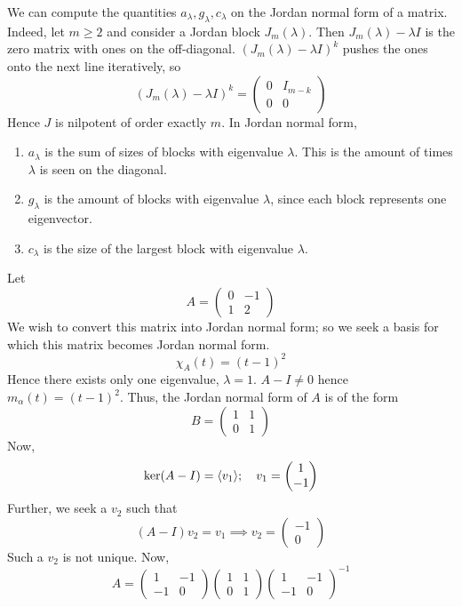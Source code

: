\begin{remark}
	We can compute the quantities \( a_\lambda, g_\lambda, c_\lambda \) on the Jordan normal form of a matrix.
	Indeed, let \( m \geq 2 \) and consider a Jordan block \( J_m(\lambda) \).
	Then \( J_m(\lambda) - \lambda I \) is the zero matrix with ones on the off-diagonal.
	\( (J_m(\lambda) - \lambda I)^k \) pushes the ones onto the next line iteratively, so
	\[
		(J_m(\lambda) - \lambda I)^k = \begin{pmatrix}
			0 & I_{m-k} \\
			0 & 0
		\end{pmatrix}
	\]
	Hence \( J \) is nilpotent of order exactly \( m \).
	In Jordan normal form,
	\begin{enumerate}
		\item \( a_\lambda \) is the sum of sizes of blocks with eigenvalue \( \lambda \).
		      This is the amount of times \( \lambda \) is seen on the diagonal.
		\item \( g_\lambda \) is the amount of blocks with eigenvalue \( \lambda \), since each block represents one eigenvector.
		\item \( c_\lambda \) is the size of the largest block with eigenvalue \( \lambda \).
	\end{enumerate}
\end{remark}
\begin{example}
	Let
	\[
		A = \begin{pmatrix}
			0 & -1 \\
			1 & 2
		\end{pmatrix}
	\]
	We wish to convert this matrix into Jordan normal form; so we seek a basis for which this matrix becomes Jordan normal form.
	\[
		\chi_A(t) = (t-1)^2
	\]
	Hence there exists only one eigenvalue, \( \lambda = 1 \).
	\( A - I \neq 0 \) hence \( m_\alpha(t) = (t-1)^2 \).
	Thus, the Jordan normal form of \( A \) is of the form
	\[
		B = \begin{pmatrix}
			1 & 1 \\
			0 & 1
		\end{pmatrix}
	\]
	Now,
	\[
		\ker(A - I) = \langle{} v_1 \rangle;\quad v_1 = \begin{pmatrix}
			1 \\ -1
		\end{pmatrix}
	\]
	Further, we seek a \( v_2 \) such that
	\[
		(A - I)v_2 = v_1 \implies v_2 = \begin{pmatrix}
			-1 \\ 0
		\end{pmatrix}
	\]
	Such a \( v_2 \) is not unique.
	Now,
	\[
		A = \begin{pmatrix}
			1  & -1 \\
			-1 & 0
		\end{pmatrix}
		\begin{pmatrix}
			1 & 1 \\
			0 & 1
		\end{pmatrix}
		\begin{pmatrix}
			1  & -1 \\
			-1 & 0
		\end{pmatrix}^{-1}
	\]
\end{example}
